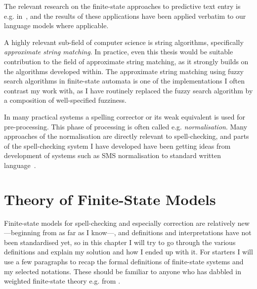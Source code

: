 \documentclass[officiallayout,draft]{unihelcompling}
\begin{document}
The relevant research on the finite-state approaches to predictive text entry
is e.g. in~\citep{silfverberg2010partofspeech}, and the results of
these applications have been applied verbatim to our language models where
applicable.

A highly relevant sub-field of computer science is string algorithms,
specifically \emph{approximate string matching}. In practice, even this
thesis would be suitable contribution to the field of approximate string
matching, as it strongly builds on the algorithms developed within. The
approximate string matching using fuzzy search algorithms in finite-state
automata is one of the implementations I often contrast my work with, as
I have routinely replaced the fuzzy search algorithm by a composition of
well-specified fuzziness.

In many practical systems a spelling corrector or its weak equivalent is used
for pre-processing. This phase of processing is often called e.g. 
\emph{normalisation}. Many approaches of the normalisation are directly
relevant to spell-checking, and parts of the spell-checking system I have
developed have been getting ideas from development of systems such as SMS
normalisation to standard written language~\citep{kobus2008normalizing}.

\section{Theory of Finite-State Models}
\label{sec:finite-state-theory}

Finite-state models for spell-checking and especially correction are relatively
new---beginning from \citep{oflazer1996errortolerant} as far as I know---, and
definitions and interpretations have not been standardised yet, so in this
chapter I will try to go through the various definitions and explain my
solution and how I ended up with it. For starters I will use a few paragraphs
to recap the formal definitions of finite-state systems and my selected
notations. These should be familiar to anyone who has dabbled in weighted
finite-state theory e.g. from \citet{aho2007compilers,mohri1997finitestate}.
\end{document}
